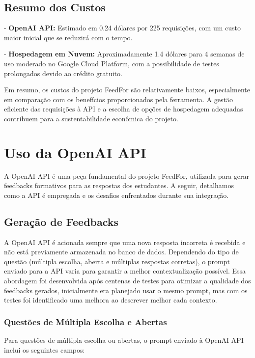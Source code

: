\subsection{Resumo dos Custos}

- \textbf{OpenAI API:} Estimado em 0.24 dólares por 225 requisições, com um custo maior inicial que se reduzirá com o tempo.

- \textbf{Hospedagem em Nuvem:} Aproximadamente 1.4 dólares para 4 semanas de uso moderado no Google Cloud Platform, com a possibilidade de testes prolongados devido ao crédito gratuito.

Em resumo, os custos do projeto FeedFor são relativamente baixos, especialmente em comparação com os benefícios proporcionados pela ferramenta. A gestão eficiente das requisições à API e a escolha de opções de hospedagem adequadas contribuem para a sustentabilidade econômica do projeto.

\section{Uso da OpenAI API}

A OpenAI API é uma peça fundamental do projeto FeedFor, utilizada para gerar feedbacks formativos para as respostas dos estudantes. A seguir, detalhamos como a API é empregada e os desafios enfrentados durante sua integração.

\subsection{Geração de Feedbacks}

A OpenAI API é acionada sempre que uma nova resposta incorreta é recebida e não está previamente armazenada no banco de dados. Dependendo do tipo de questão (múltipla escolha, aberta e múltiplas respostas corretas), o prompt enviado para a API varia para garantir a melhor contextualização possível. Essa abordagem foi desenvolvida após centenas de testes para otimizar a qualidade dos feedbacks gerados, inicialmente era planejado usar o mesmo prompt, mas com os testes foi identificado uma melhora ao descrever melhor cada contexto.

\subsubsection{Questões de Múltipla Escolha e Abertas}

Para questões de múltipla escolha ou abertas, o prompt enviado à OpenAI API inclui os seguintes campos:

